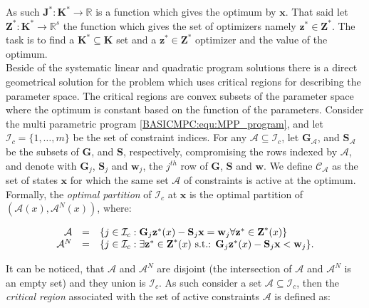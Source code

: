     As such $\textbf{J}^*:\textbf{K}^*\rightarrow\mathbb{R}$ is a function which gives the optimum by $\textbf{x}$. That said let $\textbf{Z}^*:\textbf{K}^*\rightarrow\mathbb{R}^s$ the function which gives the set of optimizers namely $\textbf{z}^*\in\textbf{Z}^*$. The task is to find a $\textbf{K}^*\subseteq\textbf{K}$ set and a $\textbf{z}^*\in\textbf{Z}^*$ optimizer and the value of the optimum.\\
    Beside of the systematic linear and quadratic program solutions \cite{borrelli2017predictive} there is a direct geometrical solution for the problem which uses critical regions for describing the parameter space. The critical regions are convex subsets of the parameter space where the optimum is constant based on the function of the parameters.
    Consider the multi parametric program \ref{BASICMPC:equ:MPP_program}, and let $\mathcal{I}_c=\{1,\dots,m\}$ be the set of constraint indices. For any $\mathcal{A}\subseteq\mathcal{I}_c$, let $\textbf{G}_{\mathcal{A}}$, and $\textbf{S}_{\mathcal{A}}$ be the subsets of $\textbf{G}$, and $\textbf{S}$, respectively, compromising the rows indexed by $\mathcal{A}$, and denote with $\textbf{G}_j$, $\textbf{S}_j$ and $\textbf{w}_j$, the $j^{th}$ row of $\textbf{G}$, $\textbf{S}$ and $\textbf{w}$. We define $\mathcal{C}_{\mathcal{A}}$ as the set of states $\textbf{x}$ for which the same set $\mathcal{A}$ of constraints is active at the optimum. Formally, the \emph{optimal partition} of $\mathcal{I}_c$ at $\textbf{x}$ is the optimal partition of $(\mathcal{A}(x),\mathcal{A}^N(x))$, where:

    \begin{equation}
    \begin{array}{rcl}
            \mathcal{A}&=&\{j\in\mathcal{I}_c:\textbf{G}_j\textbf{z}^*(x)-\textbf{S}_j\textbf{x}=\textbf{w}_j\forall\textbf{z}^*\in\textbf{Z}^*(x)\}\\
            \mathcal{A}^N&=&\{j\in\mathcal{I}_c:\exists\textbf{z}^*\in\textbf{Z}^*(x)\textnormal{ s.t.: }\textbf{G}_j\textbf{z}^*(x)-\textbf{S}_j\textbf{x}<\textbf{w}_j\}.
        \end{array}
        \label{BASICMPC:equ:MPP_stateset_optimal partition}
    \end{equation}

    It can be noticed, that $\mathcal{A}$ and $\mathcal{A}^N$ are disjoint (the intersection of $\mathcal{A}$ and $\mathcal{A}^N$ is an empty set) and they union is $\mathcal{I}_c$. As such consider a set $\mathcal{A}\subseteq\mathcal{I}_c$, then the \emph{critical region} associated with the set of active constraints $\mathcal{A}$ is defined as:

